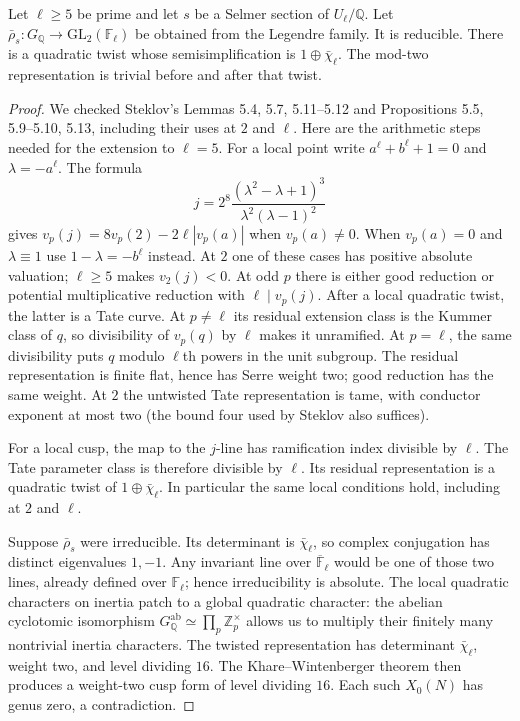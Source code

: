 \begin{lemma}
\label{E-local-representations}
Let $\ell\geq5$ be prime and let $s$ be a Selmer
section of $U_\ell/\mathbb Q$. Let
$\bar\rho_s:G_{\mathbb Q}\to\mathrm{GL}_2(\mathbb F_\ell)$
be obtained from the Legendre family.
It is reducible. There is a quadratic twist whose
semisimplification is $1\oplus\bar\chi_\ell$.
The mod-two representation is trivial before
and after that twist.
\end{lemma}
\begin{proof}
We checked Steklov's Lemmas 5.4, 5.7, 5.11--5.12 and
Propositions 5.5, 5.9--5.10, 5.13, including their
uses at $2$ and $\ell$.
Here are the arithmetic steps needed for the
extension to $\ell=5$.
For a local point write
$a^\ell+b^\ell+1=0$ and $\lambda=-a^\ell$.
The formula
\[
 j=2^8\frac{(\lambda^2-\lambda+1)^3}
                {\lambda^2(\lambda-1)^2}
\]
gives $v_p(j)=8v_p(2)-2\ell|v_p(a)|$ when
$v_p(a)\ne0$. When $v_p(a)=0$ and $\lambda\equiv1$
use $1-\lambda=-b^\ell$ instead. At $2$ one of
these cases has positive absolute valuation;
$\ell\geq5$ makes $v_2(j)<0$. At odd $p$ there
is either good reduction or potential multiplicative
reduction with $\ell\mid v_p(j)$.
After a local quadratic twist, the latter is a
Tate curve. At $p\ne\ell$ its residual extension
class is the Kummer class of $q$, so divisibility
of $v_p(q)$ by $\ell$ makes it unramified.
At $p=\ell$, the same divisibility puts $q$
modulo $\ell$th powers in the unit subgroup.
The residual representation is finite flat,
hence has Serre weight two; good reduction has
the same weight. At $2$ the untwisted Tate
representation is tame, with conductor exponent
at most two (the bound four used by Steklov
also suffices).

For a local cusp, the map to the $j$-line has
ramification index divisible by $\ell$.
The Tate parameter class is therefore divisible
by $\ell$. Its residual representation is a
quadratic twist of $1\oplus\bar\chi_\ell$.
In particular the same local conditions hold,
including at $2$ and $\ell$.

Suppose $\bar\rho_s$ were irreducible.
Its determinant is $\bar\chi_\ell$, so complex
conjugation has distinct eigenvalues $1,-1$.
Any invariant line over $\overline{\mathbb F}_\ell$
would be one of those two lines, already defined
over $\mathbb F_\ell$; hence irreducibility is
absolute. The local quadratic characters on
inertia patch to a global quadratic character:
the abelian cyclotomic isomorphism
$G_{\mathbb Q}^{\mathrm{ab}}\simeq
 \prod_p\mathbb Z_p^\times$
allows us to multiply their finitely many
nontrivial inertia characters. The twisted
representation has determinant $\bar\chi_\ell$,
weight two, and level dividing $16$.
The Khare--Wintenberger theorem then produces
a weight-two cusp form of level dividing $16$.
Each such $X_0(N)$ has genus zero, a contradiction.


\end{proof}

